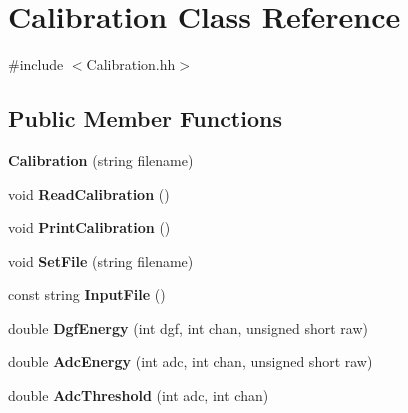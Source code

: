 \hypertarget{class_calibration}{}\section{Calibration Class Reference}
\label{class_calibration}


{\ttfamily \#include $<$Calibration.\+hh$>$}

\subsection*{Public Member Functions}
\begin{DoxyCompactItemize}
\item 
\mbox{\label{class_calibration_a8ac7c98e774549cbf0db954983c118cc}} 
{\bfseries Calibration} (string filename)
\item 
\mbox{\label{class_calibration_ad675a1c74ecd23e3af37fcffdeeed246}} 
void {\bfseries Read\+Calibration} ()
\item 
\mbox{\label{class_calibration_af224d188d64080db8d14eb0ddbb909f7}} 
void {\bfseries Print\+Calibration} ()
\item 
\mbox{\label{class_calibration_a8fe1671f5fa525d684b75f381b680f50}} 
void {\bfseries Set\+File} (string filename)
\item 
\mbox{\label{class_calibration_a10affa676c2fb505d3075d23c3bf0157}} 
const string {\bfseries Input\+File} ()
\item 
\mbox{\label{class_calibration_a0ea90a9b417ec5e50312b4bba2875f70}} 
double {\bfseries Dgf\+Energy} (int dgf, int chan, unsigned short raw)
\item 
\mbox{\label{class_calibration_a07ba44fdc31250e347939588759d2796}} 
double {\bfseries Adc\+Energy} (int adc, int chan, unsigned short raw)
\item 
\mbox{\label{class_calibration_a382d2e55bbd67aca7bef065fb311b9bc}} 
double {\bfseries Adc\+Threshold} (int adc, int chan)
\item 
\mbox{\label{class_calibration_a860b3c2c4a2350009bbbf337aa56a212}} 

\end{DoxyCompactItemize}
